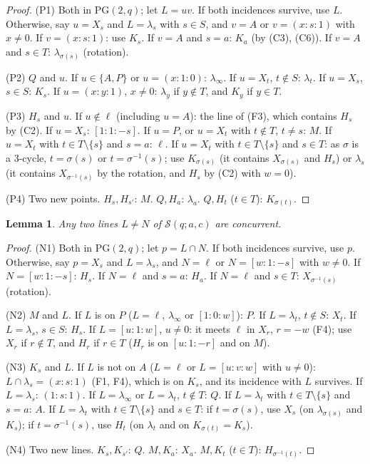 \documentclass[11pt]{amsart}
\newtheorem{lemma}[theorem]{Lemma}
\theoremstyle{definition}
\theoremstyle{remark}
\numberwithin{equation}{section}
\newcommand{\PG}{\mathrm{PG}}
\newcommand{\cS}{\mathcal S}
\begin{document}
\begin{proof}
(P1) Both in $\PG(2,q)$; let $L=uv$. If both incidences survive, use $L$. Otherwise, say $u=X_s$ and $L=\lambda_s$ with
$s\in S$, and $v=A$ or $v=(x:s:1)$ with $x\ne0$. If $v=(x:s:1)$: use $K_s$. If $v=A$ and $s=a$: $K_a$ (by (C3), (C6)). If
$v=A$ and $s\in T$: $\lambda_{\sigma(s)}$ (rotation).

(P2) $Q$ and $u$. If $u\in\{A,P\}$ or $u=(x:1:0)$: $\lambda_\infty$. If $u=X_t$, $t\notin S$: $\lambda_t$. If $u=X_s$, $s\in
S$: $K_s$. If $u=(x:y:1)$, $x\ne0$: $\lambda_y$ if $y\notin T$, and $K_y$ if $y\in T$.

(P3) $H_s$ and $u$. If $u\notin\ell$ (including $u=A$): the line of (F3), which contains $H_s$ by (C2). If $u=X_s$:
$[1:1:-s]$. If $u=P$, or $u=X_t$ with $t\notin T$, $t\ne s$: $M$. If $u=X_t$ with $t\in T\setminus\{s\}$ and $s=a$: $\ell$.
If $u=X_t$ with $t\in T\setminus\{s\}$ and $s\in T$: as $\sigma$ is a 3-cycle, $t=\sigma(s)$ or $t=\sigma^{-1}(s)$; use
$K_{\sigma(s)}$ (it contains $X_{\sigma(s)}$ and $H_s$) or $\lambda_s$ (it contains $X_{\sigma^{-1}(s)}$ by the rotation, and
$H_s$ by (C2) with $w=0$).

(P4) Two new points. $H_s,H_{s'}$: $M$. $Q,H_a$: $\lambda_a$. $Q,H_t$ ($t\in T$): $K_{\sigma(t)}$.
\end{proof}

\begin{lemma}\label{lem:hat4lines}
Any two lines $L\ne N$ of $\cS(q;a,c)$ are concurrent.
\end{lemma}

\begin{proof}
(N1) Both in $\PG(2,q)$; let $p=L\cap N$. If both incidences survive, use $p$. Otherwise, say $p=X_s$ and $L=\lambda_s$,
and $N=\ell$ or $N=[w:1:-s]$ with $w\ne0$. If $N=[w:1:-s]$: $H_s$. If $N=\ell$ and $s=a$: $H_a$. If $N=\ell$ and $s\in T$:
$X_{\sigma^{-1}(s)}$ (rotation).

(N2) $M$ and $L$. If $L$ is on $P$ ($L=\ell$, $\lambda_\infty$ or $[1:0:w]$): $P$. If $L=\lambda_t$, $t\notin S$: $X_t$. If
$L=\lambda_s$, $s\in S$: $H_s$. If $L=[u:1:w]$, $u\ne0$: it meets $\ell$ in $X_r$, $r=-w$ (F4); use $X_r$ if $r\notin T$,
and $H_r$ if $r\in T$ ($H_r$ is on $[u:1:-r]$ and on $M$).

(N3) $K_s$ and $L$. If $L$ is not on $A$ ($L=\ell$ or $L=[u:v:w]$ with $u\ne0$): $L\cap\lambda_s=(x:s:1)$ (F1, F4), which
is on $K_s$, and its incidence with $L$ survives. If $L=\lambda_s$: $(1:s:1)$. If $L=\lambda_\infty$ or $L=\lambda_t$,
$t\notin T$: $Q$. If $L=\lambda_t$ with $t\in T\setminus\{s\}$ and $s=a$: $A$. If $L=\lambda_t$ with $t\in T\setminus\{s\}$
and $s\in T$: if $t=\sigma(s)$, use $X_s$ (on $\lambda_{\sigma(s)}$ and $K_s$); if $t=\sigma^{-1}(s)$, use $H_t$ (on
$\lambda_t$ and on $K_{\sigma(t)}=K_s$).

(N4) Two new lines. $K_s,K_{s'}$: $Q$. $M,K_a$: $X_a$. $M,K_t$ ($t\in T$): $H_{\sigma^{-1}(t)}$.
\end{proof}
\end{document}
